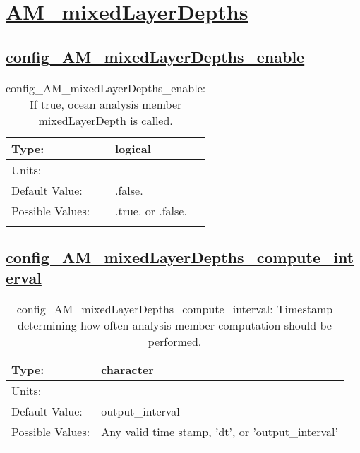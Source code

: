 \section[AM\_mixedLayerDepths]{\hyperref[sec:nm_tab_AM_mixedLayerDepths]{AM\_mixedLayerDepths}}
\label{sec:nm_sec_AM_mixedLayerDepths}
\subsection[config\_AM\_mixedLayerDepths\_enable]{\hyperref[sec:nm_tab_AM_mixedLayerDepths]{config\_AM\_mixedLayerDepths\_enable}}
\label{subsec:nm_sec_config_AM_mixedLayerDepths_enable}
\begin{center}
\begin{longtable}{| p{2.0in} || p{4.0in} |}
    \hline
    Type: & logical \\
    \hline
    Units: & -- \\
    \hline
    Default Value: & .false. \\
    \hline
    Possible Values: & .true. or .false. \\
    \hline
    \caption{config\_AM\_mixedLayerDepths\_enable: If true, ocean analysis member mixedLayerDepth is called.}
\end{longtable}
\end{center}
\subsection[config\_AM\_mixedLayerDepths\_compute\_interval]{\hyperref[sec:nm_tab_AM_mixedLayerDepths]{config\_AM\_mixedLayerDepths\_compute\_interval}}
\label{subsec:nm_sec_config_AM_mixedLayerDepths_compute_interval}
\begin{center}
\begin{longtable}{| p{2.0in} || p{4.0in} |}
    \hline
    Type: & character \\
    \hline
    Units: & -- \\
    \hline
    Default Value: & output\_interval \\
    \hline
    Possible Values: & Any valid time stamp, 'dt', or 'output\_interval' \\
    \hline
    \caption{config\_AM\_mixedLayerDepths\_compute\_interval: Timestamp determining how often analysis member computation should be performed.}
\end{longtable}
\end{center}
